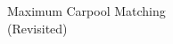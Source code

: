 \begin{frame}
    \vfill
    \begin{center}
    \Huge 
    Maximum Carpool Matching
    \\
    (Revisited)
    \end{center}
    \vfill
\end{frame}
